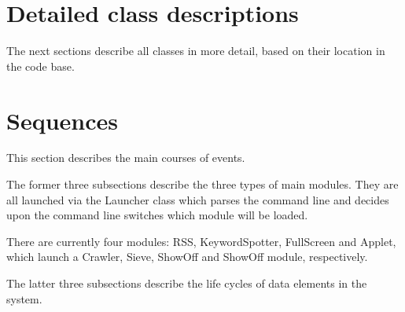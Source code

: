 \section{Detailed class descriptions}

The next sections describe all classes in more detail, based on their location
in the code base.



% 

% 

% 

% 

% 


\section{Sequences}

This section describes the main courses of events.

The former three subsections describe the three types of main modules. They are
all launched via the Launcher class which parses the command line and decides
upon the command line switches which module will be loaded.

There are currently four modules: RSS, KeywordSpotter, FullScreen and Applet,
which launch a Crawler, Sieve, ShowOff and ShowOff module, respectively.

The latter three subsections describe the life cycles of data elements in the
system.













